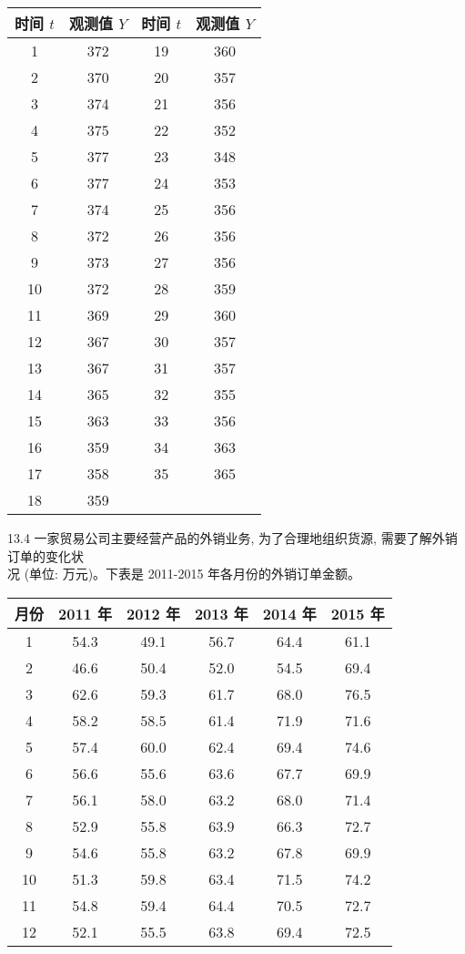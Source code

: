 \documentclass[10pt]{article}
\begin{document}
\begin{CJK*}{UTF8}{bsmi}
\begin{center}
\begin{tabular}{|c|c|c|c|}
\hline
时间 $t$ & 观测值 $Y$ & 时间 $t$ & 观测值 $Y$ \\
\hline
1 & 372 & 19 & 360 \\
\hline
2 & 370 & 20 & 357 \\
\hline
3 & 374 & 21 & 356 \\
\hline
4 & 375 & 22 & 352 \\
\hline
5 & 377 & 23 & 348 \\
\hline
6 & 377 & 24 & 353 \\
\hline
7 & 374 & 25 & 356 \\
\hline
8 & 372 & 26 & 356 \\
\hline
9 & 373 & 27 & 356 \\
\hline
10 & 372 & 28 & 359 \\
\hline
11 & 369 & 29 & 360 \\
\hline
12 & 367 & 30 & 357 \\
\hline
13 & 367 & 31 & 357 \\
\hline
14 & 365 & 32 & 355 \\
\hline
15 & 363 & 33 & 356 \\
\hline
16 & 359 & 34 & 363 \\
\hline
17 & 358 & 35 & 365 \\
\hline
18 & 359 &  &  \\
\hline
\end{tabular}
\end{center}

13.4 一家贸易公司主要经营产品的外销业务, 为了合理地组织货源, 需要了解外销订单的变化状\\
况 (单位: 万元)。下表是 2011-2015 年各月份的外销订单金额。

\begin{center}
\begin{tabular}{cccccc}
\hline
月份 & 2011 年 & 2012 年 & 2013 年 & 2014 年 & 2015 年 \\
\hline
1 & 54.3 & 49.1 & 56.7 & 64.4 & 61.1 \\
2 & 46.6 & 50.4 & 52.0 & 54.5 & 69.4 \\
3 & 62.6 & 59.3 & 61.7 & 68.0 & 76.5 \\
4 & 58.2 & 58.5 & 61.4 & 71.9 & 71.6 \\
5 & 57.4 & 60.0 & 62.4 & 69.4 & 74.6 \\
6 & 56.6 & 55.6 & 63.6 & 67.7 & 69.9 \\
7 & 56.1 & 58.0 & 63.2 & 68.0 & 71.4 \\
8 & 52.9 & 55.8 & 63.9 & 66.3 & 72.7 \\
9 & 54.6 & 55.8 & 63.2 & 67.8 & 69.9 \\
10 & 51.3 & 59.8 & 63.4 & 71.5 & 74.2 \\
11 & 54.8 & 59.4 & 64.4 & 70.5 & 72.7 \\
12 & 52.1 & 55.5 & 63.8 & 69.4 & 72.5 \\
\hline
\end{tabular}
\end{center}


\end{CJK*}
\end{document}
